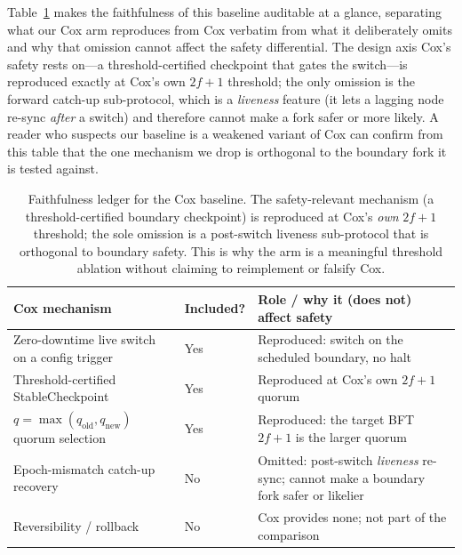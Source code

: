 \documentclass[journal]{IEEEtran}
\theoremstyle{definition}
\theoremstyle{remark}
\begin{document}
Table~\ref{tab:coxfaithful} makes the faithfulness of this baseline auditable at a glance,
separating what our Cox arm reproduces from Cox verbatim from what it deliberately omits and why
that omission cannot affect the safety differential. The design axis Cox's safety rests on---a
threshold-certified checkpoint that gates the switch---is reproduced exactly at Cox's own
$2f{+}1$ threshold; the only omission is the forward catch-up sub-protocol, which is a
\emph{liveness} feature (it lets a lagging node re-sync \emph{after} a switch) and therefore
cannot make a fork safer or more likely. A reader who suspects our baseline is a weakened variant
of Cox can confirm from this table that the one mechanism we drop is orthogonal to the boundary
fork it is tested against.

\begin{table}[t]
\centering
\caption{Faithfulness ledger for the Cox baseline. The safety-relevant mechanism (a
threshold-certified boundary checkpoint) is reproduced at Cox's \emph{own} $2f{+}1$ threshold; the
sole omission is a post-switch liveness sub-protocol that is orthogonal to boundary safety. This is
why the arm is a meaningful threshold ablation without claiming to reimplement or falsify Cox.}
\label{tab:coxfaithful}
\setlength{\tabcolsep}{5pt}
\renewcommand{\arraystretch}{1.2}
\footnotesize
\begin{tabular}{p{}p{}p{}}
\toprule
Cox mechanism & Included? & Role / why it (does not) affect safety \\
\midrule
Zero-downtime live switch on a config trigger & Yes & Reproduced: switch on the scheduled boundary, no halt \\
Threshold-certified StableCheckpoint & Yes & Reproduced at Cox's own $2f{+}1$ quorum \\
$q=\max(q_{\mathrm{old}},q_{\mathrm{new}})$ quorum selection & Yes & Reproduced: the target BFT $2f{+}1$ is the larger quorum \\
Epoch-mismatch catch-up recovery & No & Omitted: post-switch \emph{liveness} re-sync; cannot make a boundary fork safer or likelier \\
Reversibility / rollback & No & Cox provides none; not part of the comparison \\
\bottomrule
\end{tabular}
\end{table}
\end{document}
